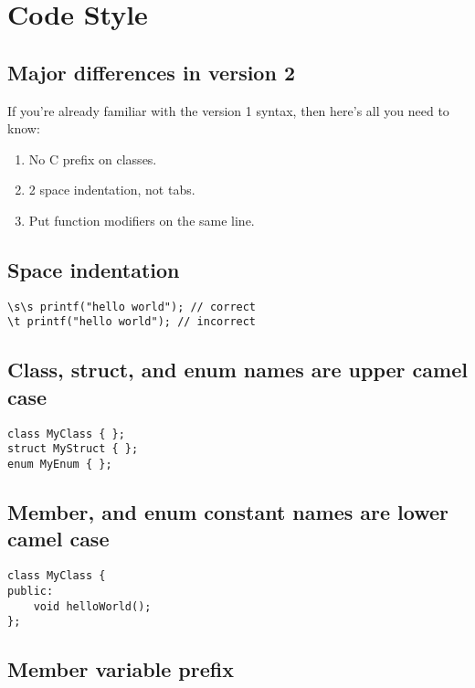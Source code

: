 \section{Code Style}

\subsection{Major differences in version 2}

If you're already familiar with the version 1 syntax, then here's all you need
to know:

\begin{enumerate}
  \item No C prefix on classes.
  \item 2 space indentation, not tabs.
  \item Put function modifiers on the same line.
\end{enumerate}

\subsection{Space indentation}

\begin{verbatim}
\s\s printf("hello world"); // correct
\t printf("hello world"); // incorrect
\end{verbatim}

\subsection{Class, struct, and enum names are upper camel case}

\begin{verbatim}
class MyClass { };
struct MyStruct { };
enum MyEnum { };
\end{verbatim}

\subsection{Member, and enum constant names are lower camel case}

\begin{verbatim}
class MyClass {
public:
    void helloWorld();
};
\end{verbatim}

\subsection{Member variable prefix}

